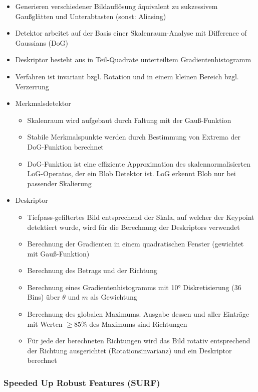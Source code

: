 \documentclass[paper=a4, fontsize=11pt]{scrartcl} %
\numberwithin{equation}{section} %
\numberwithin{figure}{section} %
\numberwithin{table}{section} %
\begin{document}
\begin{itemize}
\item Generieren verschiedener Bildauflösung äquivalent zu sukzessivem Gaußglätten und Unterabtasten (sonst: Aliasing)
\item Detektor arbeitet auf der Basis einer Skalenraum-Analyse mit Difference of Gaussians (DoG)
\item Deskriptor besteht aus in Teil-Quadrate unterteiltem Gradientenhistogramm
\item Verfahren ist invariant bzgl. Rotation und in einem kleinen Bereich bzgl. Verzerrung
\item Merkmalsdetektor
\begin{itemize}
\item Skalenraum wird aufgebaut durch Faltung mit der Gauß-Funktion
\item Stabile Merkmalspunkte werden durch Bestimmung von Extrema der DoG-Funktion berechnet
\item DoG-Funktion ist eine effiziente Approximation des skalennormalisierten LoG-Operatos, der ein Blob Detektor ist. LoG erkennt Blob nur bei passender Skalierung
\end{itemize}
\item Deskriptor
\begin{itemize}
\item Tiefpass-gefiltertes Bild entsprechend der Skala, auf welcher der Keypoint detektiert wurde, wird für die Berechnung der Deskriptors verwendet
\item Berechnung der Gradienten in einem quadratischen Fenster (gewichtet mit Gauß-Funktion)
\item Berechnung des Betrags und der Richtung
\item Berechnung eines Gradientenhistogramms mit 10° Diskretisierung (36 Bins) über $\theta$ und $m$ als Gewichtung
\item Berechnung des globalen Maximums. Ausgabe dessen und aller Einträge mit Werten $\ge 85\%$ des Maximums sind Richtungen
\item Für jede der berechneten Richtungen wird das Bild rotativ entsprechend der Richtung ausgerichtet (Rotationsinvarianz) und ein Deskriptor berechnet
\end{itemize}
\end{itemize}

\subsubsection{Speeded Up Robust Features (SURF)}
\end{document}
